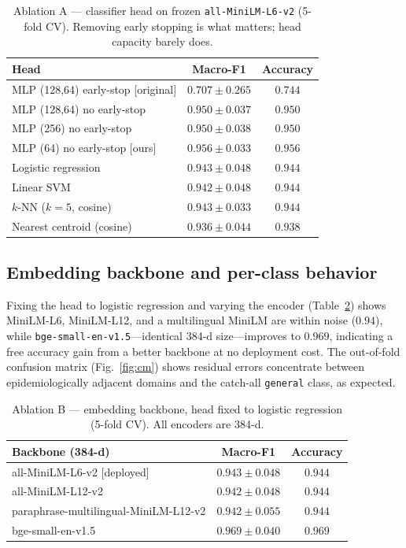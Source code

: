 \documentclass[runningheads]{llncs}
\begin{document}
\begin{table}[t]
\centering
\caption{Ablation A --- classifier head on frozen \texttt{all-MiniLM-L6-v2}
(5-fold CV). Removing early stopping is what matters; head capacity barely does.}
\label{tab:ablA}
\begin{tabular}{lcc}
\toprule
Head & Macro-F1 & Accuracy \\
\midrule
MLP (128,64) early-stop [original] & $0.707 \pm 0.265$ & $0.744$ \\
MLP (128,64) no early-stop         & $0.950 \pm 0.037$ & $0.950$ \\
MLP (256) no early-stop            & $0.950 \pm 0.038$ & $0.950$ \\
MLP (64) no early-stop [ours]      & $0.956 \pm 0.033$ & $0.956$ \\
Logistic regression                & $0.943 \pm 0.048$ & $0.944$ \\
Linear SVM                         & $0.942 \pm 0.048$ & $0.944$ \\
$k$-NN ($k{=}5$, cosine)          & $0.943 \pm 0.033$ & $0.944$ \\
Nearest centroid (cosine)          & $0.936 \pm 0.044$ & $0.938$ \\
\bottomrule
\end{tabular}
\end{table}

\subsection{Embedding backbone and per-class behavior}
Fixing the head to logistic regression and varying the encoder (Table~\ref{tab:ablB})
shows MiniLM-L6, MiniLM-L12, and a multilingual MiniLM are within noise ($0.94$),
while \texttt{bge-small-en-v1.5}---identical 384-d size---improves to $0.969$,
indicating a free accuracy gain from a better backbone at no deployment cost.
The out-of-fold confusion matrix (Fig.~\ref{fig:cm}) shows residual errors
concentrate between epidemiologically adjacent domains and the catch-all
\texttt{general} class, as expected.

\begin{table}[t]
\centering
\caption{Ablation B --- embedding backbone, head fixed to logistic regression
(5-fold CV). All encoders are 384-d.}
\label{tab:ablB}
\begin{tabular}{lcc}
\toprule
Backbone (384-d) & Macro-F1 & Accuracy \\
\midrule
all-MiniLM-L6-v2 [deployed]                 & $0.943 \pm 0.048$ & $0.944$ \\
all-MiniLM-L12-v2                           & $0.942 \pm 0.048$ & $0.944$ \\
paraphrase-multilingual-MiniLM-L12-v2       & $0.942 \pm 0.055$ & $0.944$ \\
bge-small-en-v1.5                           & $\mathbf{0.969 \pm 0.040}$ & $\mathbf{0.969}$ \\
\bottomrule
\end{tabular}
\end{table}
\end{document}
